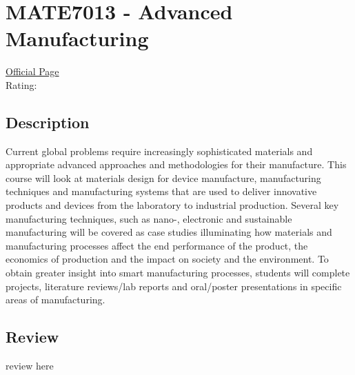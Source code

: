 \hypertarget{MATE7013}{\section{MATE7013 - Advanced Manufacturing}}

\large
\textcolor{turbo_purple}{\href{https://my.uq.edu.au/programs-courses/course.html?course_code=MATE7013}{Official Page}} \\
Rating: \cstar\cstar\cstar\cstar\ostar

\normalsize
\subsection*{Description}
Current global problems require increasingly sophisticated materials and appropriate advanced approaches and methodologies for their manufacture.
This course will look at materials design for device manufacture, manufacturing techniques and manufacturing systems that are used to deliver innovative products and devices from the laboratory to industrial production.
Several key manufacturing techniques, such as nano-, electronic and sustainable manufacturing will be covered as case studies illuminating how materials and manufacturing processes affect the end performance of the product, the economics of production and the impact on society and the environment.
To obtain greater insight into smart manufacturing processes, students will complete projects, literature reviews/lab reports and oral/poster presentations in specific areas of manufacturing.

\subsection*{Review}
review here
